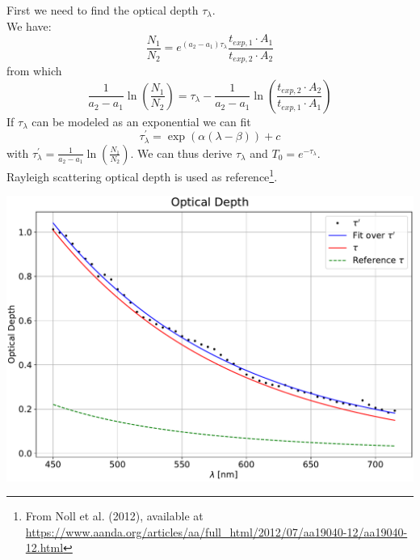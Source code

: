 \documentclass[a4paper]{article}
\newenvironment{Figure}
	{\par\medskip\noindent\minipage{\linewidth}}
	{\endminipage\par\medskip}
\begin{document}
\begin{multicols}{2}
			First we need to find the optical depth $\tau_{\lambda}$.\\
			We have:
			\begin{equation}
					\frac{N_1}{N_2} = e^{(a_2 - a_1) \tau_{\lambda}} \frac{t_{exp,1} \cdot A_1}{t_{exp,2} \cdot A_2}
			\end{equation}
			from which
			\begin{equation}
				\frac{1}{a_2 - a_1}\ln\left(\frac{N_1}{N_2}\right) = \tau_{\lambda} - \frac{1}{a_2 - a_1}\ln\left(\frac{t_{exp,2} \cdot A_2}{t_{exp,1} \cdot A_1}\right)
			\end{equation}
			\newline
			If $\tau_{\lambda}$ can be modeled as an exponential we can fit 
			\begin{equation*}
				\tau_{\lambda}^{'} = \exp(\alpha (\lambda - \beta)) + c
			\end{equation*}
			with $\tau_{\lambda}^{'} = \frac{1}{a_2 - a_1}\ln\left(\frac{N_1}{N_2}\right)$.
			\newline
			\newline
			We can thus derive $\tau_{\lambda}$ and $T_0 = e^{-\tau_{\lambda}}$.\\
			Rayleigh scattering optical depth is used as reference\footnote{From Noll et al. (2012), available at  \url{https://www.aanda.org/articles/aa/full_html/2012/07/aa19040-12/aa19040-12.html}}.\\
			\begin{Figure}
				\centering
				\includegraphics[width=\linewidth]{Opt_depth.pdf}
				\label{fig:opt_depth}
			\end{Figure}
			\begin{Figure}

\end{Figure}
\end{multicols}
\end{document}
